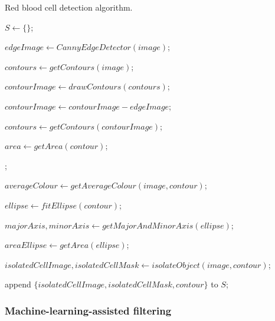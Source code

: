\begin{algorithm}[!ht]
    \caption{Red blood cell detection algorithm.}\label{alg:rbc-detection}


    $S \gets \{\}$;

    $edgeImage \gets CannyEdgeDetector(image)$;

    $contours \gets getContours(image)$;

    $contourImage \gets drawContours(contours)$;

    $contourImage \gets contourImage - edgeImage$;

    $contours \gets getContours(contourImage)$;

     {
        $area \gets getArea(contour)$;

        ;
        {
            $averageColour \gets getAverageColour(image,contour)$;

            {
                $ellipse \gets fitEllipse(contour)$;

                $majorAxis,minorAxis \gets getMajorAndMinorAxis(ellipse)$;

                $areaEllipse \gets getArea(ellipse)$;

                {
                    $isolatedCellImage,isolatedCellMask \gets isolateObject(image,contour)$;

                    append $\{isolatedCellImage,isolatedCellMask,contour\}$ to $S$;
                }
            }
        }
    }
\end{algorithm}    

\subsubsection{Machine-learning-assisted filtering}

